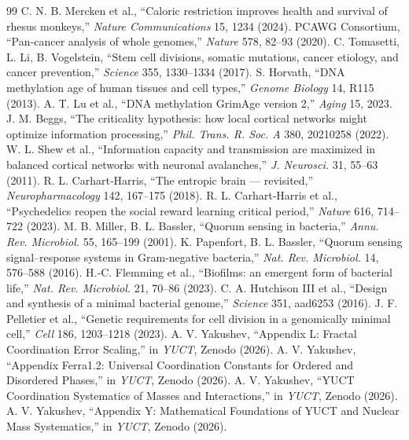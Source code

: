 \documentclass[11pt,a4paper]{article}
\begin{document}
\begin{thebibliography}{99}
		 C. N. B. Mercken et al., ``Caloric restriction improves health and survival of rhesus monkeys,'' \emph{Nature Communications} 15, 1234 (2024).
		 PCAWG Consortium, ``Pan‑cancer analysis of whole genomes,'' \emph{Nature} 578, 82–93 (2020).
		 C. Tomasetti, L. Li, B. Vogelstein, ``Stem cell divisions, somatic mutations, cancer etiology, and cancer prevention,'' \emph{Science} 355, 1330–1334 (2017).
		 S. Horvath, ``DNA methylation age of human tissues and cell types,'' \emph{Genome Biology} 14, R115 (2013).
		 A. T. Lu et al., ``DNA methylation GrimAge version 2,'' \emph{Aging} 15, 2023.
		 J. M. Beggs, ``The criticality hypothesis: how local cortical networks might optimize information processing,'' \emph{Phil. Trans. R. Soc. A} 380, 20210258 (2022).
		 W. L. Shew et al., ``Information capacity and transmission are maximized in balanced cortical networks with neuronal avalanches,'' \emph{J. Neurosci.} 31, 55–63 (2011).
		 R. L. Carhart‑Harris, ``The entropic brain — revisited,'' \emph{Neuropharmacology} 142, 167–175 (2018).
		 R. L. Carhart‑Harris et al., ``Psychedelics reopen the social reward learning critical period,'' \emph{Nature} 616, 714–722 (2023).
		 M. B. Miller, B. L. Bassler, ``Quorum sensing in bacteria,'' \emph{Annu. Rev. Microbiol.} 55, 165–199 (2001).
		 K. Papenfort, B. L. Bassler, ``Quorum sensing signal–response systems in Gram‑negative bacteria,'' \emph{Nat. Rev. Microbiol.} 14, 576–588 (2016).
		 H.‑C. Flemming et al., ``Biofilms: an emergent form of bacterial life,'' \emph{Nat. Rev. Microbiol.} 21, 70–86 (2023).
		 C. A. Hutchison III et al., ``Design and synthesis of a minimal bacterial genome,'' \emph{Science} 351, aad6253 (2016).
		 J. F. Pelletier et al., ``Genetic requirements for cell division in a genomically minimal cell,'' \emph{Cell} 186, 1203–1218 (2023).
		 A. V. Yakushev, ``Appendix L: Fractal Coordination Error Scaling,'' in \emph{YUCT}, Zenodo (2026).
		 A. V. Yakushev, ``Appendix Ferra1.2: Universal Coordination Constants for Ordered and Disordered Phases,'' in \emph{YUCT}, Zenodo (2026).
		 A. V. Yakushev, ``YUCT Coordination Systematics of Masses and Interactions,'' in \emph{YUCT}, Zenodo (2026).
		 A. V. Yakushev, ``Appendix Y: Mathematical Foundations of YUCT and Nuclear Mass Systematics,'' in \emph{YUCT}, Zenodo (2026).

\end{thebibliography}
\end{document}
